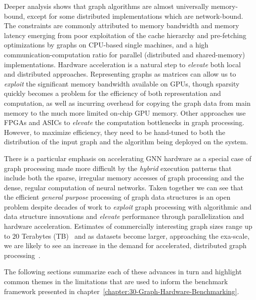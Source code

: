Deeper analysis shows that graph algorithms are almost universally memory-bound, except for some distributed implementations which are network-bound. 
The constraints are commonly attributed to memory bandwidth and memory latency emerging from poor exploitation of the cache hierarchy and pre-fetching optimizations by graphs on CPU-based single machines, and a high communication-computation ratio for parallel (distributed and shared-memory) implementations. 
Hardware acceleration is a natural step to \textit{elevate} both local and distributed approaches. 
Representing graphs as matrices can allow us to \textit{exploit} the significant memory bandwidth available on GPUs, though sparsity quickly becomes a problem for the efficiency of both representation and computation, as well as incurring overhead for copying the graph data from main memory to the much more limited on-chip GPU memory. 
Other approaches use FPGAs and ASICs to \textit{elevate} the computation bottlenecks in graph processing. 
However, to maximize efficiency, they need to be hand-tuned to both the distribution of the input graph and the algorithm being deployed on the system.

There is a particular emphasis on accelerating GNN hardware as a special case of graph processing made more difficult by the \textit{hybrid} execution patterns that include both the sparse, irregular memory accesses of graph processing and the dense, regular computation of neural networks.
Taken together we can see that the efficient \textit{general purpose} processing of graph data structures is an open problem despite decades of work to \textit{exploit} graph processing with algorithmic and data structure innovations and \textit{elevate} performance through parallelization and hardware acceleration. 
Estimates of commercially interesting graph sizes range up to $20$ Terabytes (TB)~\cite{Aananthakrishnan2020} and as datasets become larger, approaching the exa-scale, we are likely to see an increase in the demand for accelerated, distributed graph processing~\cite{Azad2021}.

The following sections summarize each of these advances in turn and highlight common themes in the limitations that are used to inform the benchmark framework presented in chapter~\ref{chapter:30-Graph-Hardware-Benchmarking}.


